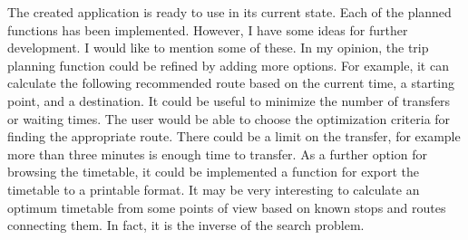 The created application is ready to use in its current state. Each of the planned functions has been implemented. However, I have some ideas for further development. I would like to mention some of these. In my opinion, the trip planning function could be refined by adding more options. For example, it can calculate the following recommended route based on the current time, a starting point, and a destination. It could be useful to minimize the number of transfers or waiting times. The user would be able to choose the optimization criteria for finding the appropriate route. There could be a limit on the transfer, for example more than three minutes is enough time to transfer. As a further option for browsing the timetable, it could be implemented a function for export the timetable to a printable format. It may be very interesting to calculate an optimum timetable from some points of view based on known stops and routes connecting them. In fact, it is the inverse of the search problem.
